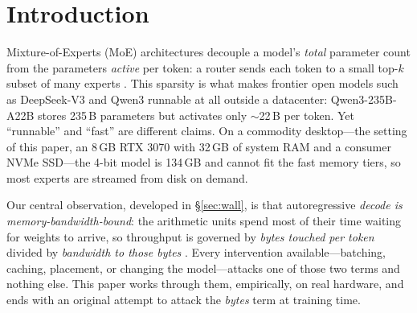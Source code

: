 \documentclass[11pt]{article}
\begin{document}
\section{Introduction}
Mixture-of-Experts (MoE) architectures decouple a model's \emph{total} parameter
count from the parameters \emph{active} per token: a router sends each token to
a small top-$k$ subset of many experts \citep{shazeer2017moe,fedus2022switch}.
This sparsity is what makes frontier open models such as DeepSeek-V3
\citep{deepseekai2024deepseekv3} and Qwen3 \citep{yang2025qwen3} runnable at all outside a datacenter:
Qwen3-235B-A22B stores 235\,B parameters but activates only $\sim$22\,B per
token. Yet ``runnable'' and ``fast'' are different claims. On a commodity
desktop---the setting of this paper, an 8\,GB RTX 3070 with 32\,GB of system
RAM and a consumer NVMe SSD---the 4-bit model is 134\,GB and cannot fit the fast
memory tiers, so most experts are streamed from disk on demand.

Our central observation, developed in \S\ref{sec:wall}, is that autoregressive
\emph{decode is memory-bandwidth-bound}: the arithmetic units spend most of
their time waiting for weights to arrive, so throughput is governed by
\emph{bytes touched per token} divided by \emph{bandwidth to those bytes}
\citep{sheng2023flexgen,xiao2024streamingllm}. Every intervention available---batching, caching,
placement, or changing the model---attacks one of those two terms and nothing
else. This paper works through them, empirically, on real hardware, and ends
with an original attempt to attack the \emph{bytes} term at training time.
\end{document}
